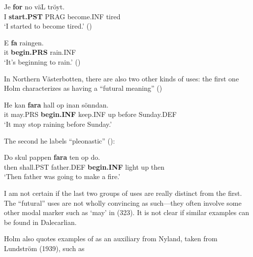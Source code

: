 \ea\label{}
\gll Je  \textbf{for} no  väL  tröyt.\\
I  \textbf{start.PST} PRAG  become.INF  tired\\
\glt ‘I started to become tired.’ (\citet[19]{Holm1942})
\z

\ea\label{}
\gll E  \textbf{fa} raingen.\\
it  \textbf{begin.PRS} rain.INF\\
\glt ‘It’s beginning to rain.’ (\citet[115]{Levander1909})
\z

In Northern Västerbotten, there are also two other kinds of uses: the first one Holm characterizes as having a “futural meaning” (\citet[20]{Holm1941})


\ea\label{}
\gll He  kan  \textbf{fara} hall  op  inan  sönndan.\\
it  may.PRS  \textbf{begin.INF} keep.INF  up  before  Sunday.DEF\\
\glt  ‘It may stop raining before Sunday.’
\z

The second he labels “pleonastic” (\citet[21]{Holm1941}):


\ea\label{}
\gll Do  skul  pappen  \textbf{fara} ten  op  do.\\
then  shall.PST  father.DEF  \textbf{begin.INF} light  up  then\\
\glt ‘Then father was going to make a fire.’
\z

I am not certain if the last two groups of uses are really distinct from the first. The “futural” uses are not wholly convincing as such—they often involve some other modal marker such as  ‘may’ in (323). It is not clear if similar examples can be found in Dalecarlian. 


Holm also quotes examples of  as an auxiliary from Nyland, taken from Lundström (1939), such as

